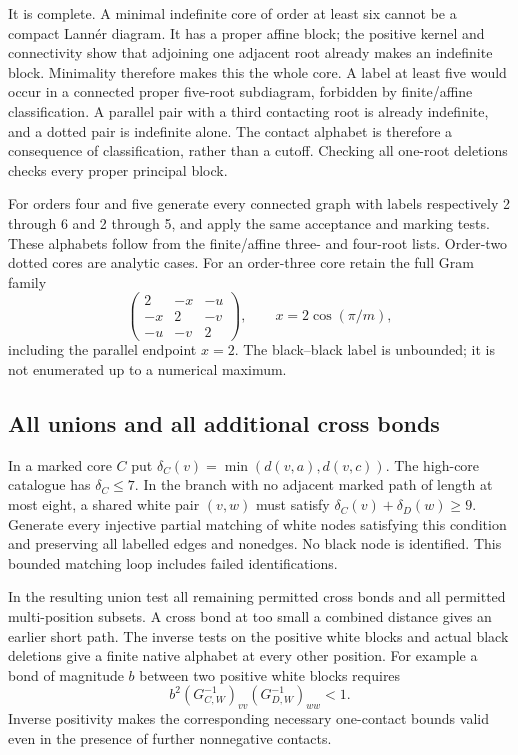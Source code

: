 \documentclass[11pt]{article}
\theoremstyle{remark}\newtheorem{remark}[theorem]{Remark}
\begin{document}
It is complete. A minimal indefinite core of order at least six
cannot be a compact Lann\'er diagram. It has a proper affine block;
the positive kernel and connectivity show that adjoining one adjacent
root already makes an indefinite block. Minimality therefore makes
this the whole core. A label at least five would occur in a connected
proper five-root subdiagram, forbidden by finite/affine classification.
A parallel pair with a third contacting root is already indefinite,
and a dotted pair is indefinite alone. The contact alphabet is
therefore a consequence of classification, rather than a cutoff.
Checking all one-root deletions checks every proper principal block.

For orders four and five generate every connected graph with labels
respectively 2 through 6 and 2 through 5, and apply the same acceptance
and marking tests. These alphabets follow from the finite/affine
three- and four-root lists. Order-two dotted cores are analytic
cases. For an order-three core retain the full Gram family
\[
 \begin{pmatrix}2&-x&-u\\-x&2&-v\\-u&-v&2\end{pmatrix},
 \qquad x=2\cos(\pi/m),
\]
including the parallel endpoint $x=2$. The black--black label is
unbounded; it is not enumerated up to a numerical maximum.

\subsection{All unions and all additional cross bonds}

In a marked core $C$ put
$\delta_C(v)=\min(d(v,a),d(v,c))$. The high-core catalogue has
$\delta_C\le7$. In the branch with no adjacent marked path of
length at most eight, a shared white pair $(v,w)$ must satisfy
$\delta_C(v)+\delta_D(w)\ge9$. Generate every injective partial
matching of white nodes satisfying this condition and preserving
all labelled edges and nonedges. No black node is identified.
This bounded matching loop includes failed identifications.

In the resulting union test all remaining permitted cross bonds
and all permitted multi-position subsets. A cross bond at too small
a combined distance gives an earlier short path. The inverse tests
on the positive white blocks and actual black deletions give a
finite native alphabet at every other position. For example a bond
of magnitude $b$ between two positive white blocks requires
\[
 b^2(G_{C,W}^{-1})_{vv}(G_{D,W}^{-1})_{ww}<1.
\]
Inverse positivity makes the corresponding necessary one-contact
bounds valid even in the presence of further nonnegative contacts.
\end{document}
